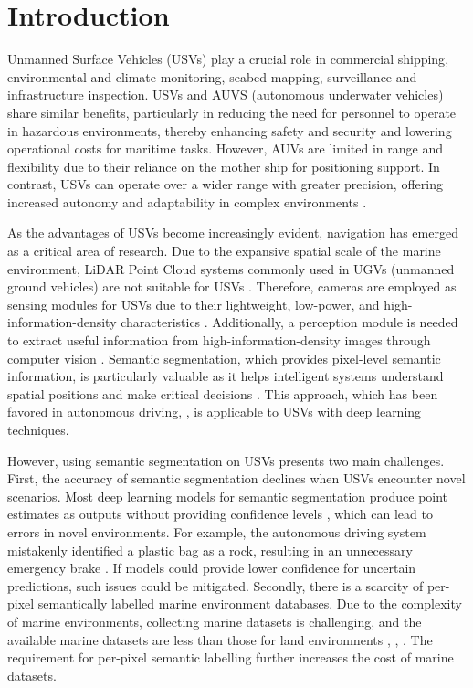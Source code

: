 \section{Introduction}
Unmanned Surface Vehicles (USVs) play a crucial role in commercial shipping\cite{USVshipping}, environmental 
and climate monitoring\cite{USVenvmonitor}, seabed mapping\cite{USVseabedmap}, surveillance and infrastructure 
inspection\cite{USVbridgeinspection}. USVs and AUVS (autonomous underwater vehicles) share similar benefits, 
particularly in reducing the need for personnel to operate in hazardous environments, thereby enhancing safety 
and security and lowering operational costs for maritime tasks. However, AUVs are limited in range and flexibility 
due to their reliance on the mother ship for positioning support\cite{AUV}. In contrast, USVs can operate over 
a wider range with greater precision, offering increased autonomy and adaptability in complex environments 
\cite{USVoverview}. 

As the advantages of USVs become increasingly evident, navigation has emerged as a critical area of 
research. Due to the expansive spatial scale of the marine environment, LiDAR Point Cloud systems commonly 
used in UGVs (unmanned ground vehicles) are not suitable for USVs \cite{lidarpointcloud}. Therefore, cameras 
are employed as sensing modules for USVs due to their lightweight, low-power, and high-information-density 
characteristics \cite{MODS}. Additionally, a perception module is needed to extract useful information from 
high-information-density images through computer vision \cite{perceptionmodule}. Semantic segmentation, which 
provides pixel-level semantic information, is particularly valuable as it helps intelligent systems understand 
spatial positions and make critical decisions \cite{SSsurvey}. This approach, which has been favored in autonomous 
driving\cite{autodrive1}, \cite{autodrive2}, is applicable to USVs with deep learning techniques.

However, using semantic segmentation on USVs presents two main challenges. First, the accuracy of semantic 
segmentation declines when USVs encounter novel scenarios. Most deep learning models for semantic segmentation 
produce point estimates as outputs without providing confidence levels \cite{evaluateBDL}, which can lead to 
errors in novel environments. For example, the autonomous driving system mistakenly identified a plastic bag as a 
rock, resulting in an unnecessary emergency brake \cite{autodrive-mistake}.
If models could provide lower confidence for uncertain predictions, 
such issues could be mitigated. Secondly, there is a scarcity of per-pixel semantically labelled marine environment 
databases. Due to the complexity of marine environments, collecting marine datasets is challenging, and the 
available marine datasets are less than those for land environments \cite{CamVid}, \cite{Cityscapes}, 
\cite{landsemanticdataset}. The requirement for per-pixel semantic labelling further increases the cost of marine 
datasets. 

